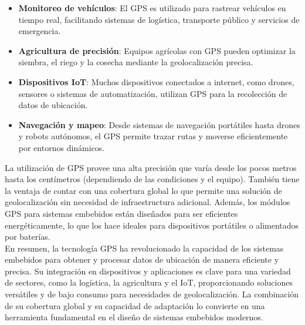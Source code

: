 \begin{itemize}
    \item \textbf{Monitoreo de vehículos}: El GPS es utilizado para rastrear vehículos en tiempo real, facilitando sistemas de logística, transporte público y servicios de emergencia.

    \item \textbf{Agricultura de precisión}: Equipos agrícolas con GPS pueden optimizar la siembra, el riego y la cosecha mediante la geolocalización precisa.

    \item \textbf{Dispositivos IoT}: Muchos dispositivos conectados a internet, como drones, sensores o sistemas de automatización, utilizan GPS para la recolección de datos de ubicación.

    \item \textbf{Navegación y mapeo}: Desde sistemas de navegación portátiles hasta drones y robots autónomos, el GPS permite trazar rutas y moverse eficientemente por entornos dinámicos.
\end{itemize}


La utilización de GPS provee una alta precisión que varía desde los pocos metros hasta los centímetros (dependiendo de las condiciones y el equipo). También tiene la ventaja de contar con una cobertura global lo que permite una solución de geolocalización sin necesidad de infraestructura adicional. Además, los módulos GPS para sistemas embebidos están diseñados para ser eficientes energéticamente, lo que los hace ideales para dispositivos portátiles o alimentados por baterías. \\ 

En resumen, la tecnología GPS ha revolucionado la capacidad de los sistemas embebidos para obtener y procesar datos de ubicación de manera eficiente y precisa. Su integración en dispositivos y aplicaciones es clave para una variedad de sectores, como la logística, la agricultura y el IoT, proporcionando soluciones versátiles y de bajo consumo para necesidades de geolocalización. La combinación de su cobertura global y su capacidad de adaptación lo convierte en una herramienta fundamental en el diseño de sistemas embebidos modernos.